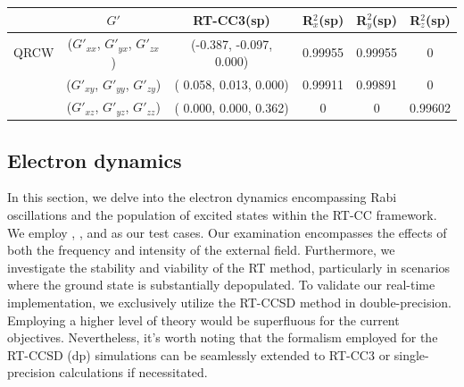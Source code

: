 \begin{table}
\begin{tabular}{c|c|c|ccc}
                 \hline
                                            &  $G'$ & \textrm{RT-CC3(sp)} & R$^{2}_{x}$(sp) & R$^{2}_{y}$(sp)& R$^{2}_{z}$(sp)\\
                                          \hline
                \textrm{QRCW} & ($G'_{xx}$, $G'_{yx}$, $G'_{zx}$) & (-0.387, -0.097, 0.000) &   0.99955 & 0.99955 & 0 \\
                                          & ($G'_{xy}$, $G'_{yy}$, $G'_{zy}$) & ( 0.058,  0.013, 0.000) &  0.99911 & 0.99891 & 0 \\
                                          & ($G'_{xz}$, $G'_{yz}$, $G'_{zz}$) & ( 0.000,  0.000, 0.362) &   0 & 0 & 0.99602 \\  
                
   \end{tabular}
  \label{tab:g-cc3}
\end{table}

\subsection{Electron dynamics}\label{results-cc3-3}

In this section, we delve into the electron dynamics encompassing Rabi oscillations and the population of excited states within the RT-CC framework. We employ , , and  as our test cases. Our examination encompasses the effects of both the frequency and intensity of the external field. Furthermore, we investigate the stability and viability of the RT method, particularly in scenarios where the ground state is substantially depopulated. To validate our real-time implementation, we exclusively utilize the RT-CCSD method in double-precision. Employing a higher level of theory would be superfluous for the current objectives. Nevertheless, it's worth noting that the formalism employed for the RT-CCSD (dp) simulations can be seamlessly extended to RT-CC3 or single-precision calculations if necessitated.

